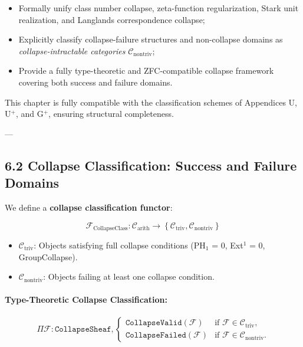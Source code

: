 \documentclass[11pt]{article}
\begin{document}
\begin{itemize}
    \item Formally unify class number collapse, zeta-function regularization, Stark unit realization, and Langlands correspondence collapse;
    \item Explicitly classify collapse-failure structures and non-collapse domains as \emph{collapse-intractable categories} \( \mathcal{C}_{\mathrm{nontriv}} \);
    \item Provide a fully type-theoretic and ZFC-compatible collapse framework covering both success and failure domains.
\end{itemize}

This chapter is fully compatible with the classification schemes of Appendices U, U$^{+}$, and G$^{+}$, ensuring structural completeness.

---

\subsection*{6.2 Collapse Classification: Success and Failure Domains}

We define a \textbf{collapse classification functor}:

\[
\mathcal{F}_{\mathrm{CollapseClass}} : \mathcal{C}_{\mathrm{arith}} \longrightarrow \left\{ \mathcal{C}_{\mathrm{triv}}, \mathcal{C}_{\mathrm{nontriv}} \right\}
\]

\begin{itemize}
    \item \( \mathcal{C}_{\mathrm{triv}} \): Objects satisfying full collapse conditions (PH$_1$ = 0, Ext$^1$ = 0, GroupCollapse).
    \item \( \mathcal{C}_{\mathrm{nontriv}} \): Objects failing at least one collapse condition.
\end{itemize}

\paragraph{Type-Theoretic Collapse Classification:}

\[
\Pi \mathcal{F} : \texttt{CollapseSheaf},
\begin{cases}
\texttt{CollapseValid}(\mathcal{F}) & \text{if } \mathcal{F} \in \mathcal{C}_{\mathrm{triv}}, \\
\texttt{CollapseFailed}(\mathcal{F}) & \text{if } \mathcal{F} \in \mathcal{C}_{\mathrm{nontriv}}.
\end{cases}
\]
\end{document}
